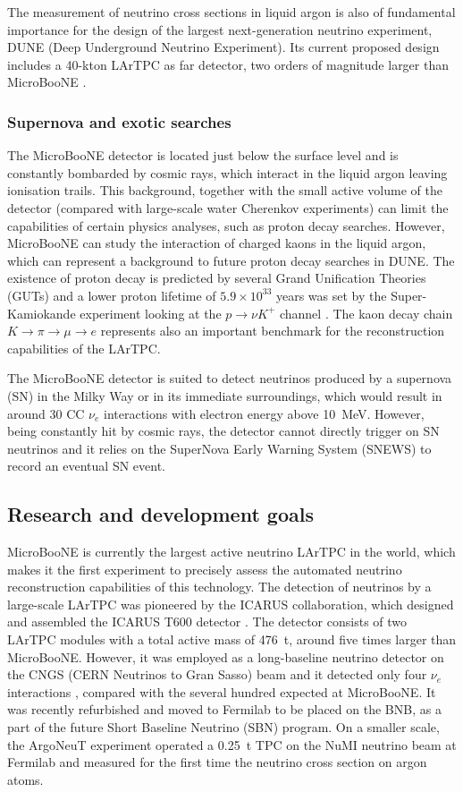 The measurement of neutrino cross sections in liquid argon is also of fundamental importance for the design of the largest next-generation neutrino experiment, DUNE (Deep Underground Neutrino Experiment). Its current proposed design includes a 40-kton LArTPC as far detector, two orders of magnitude larger than MicroBooNE \cite{Acciarri:2016ooe}.

\subsubsection{Supernova and exotic searches}
The MicroBooNE detector is located just below the surface level and is constantly bombarded by cosmic rays, which interact in the liquid argon leaving ionisation trails. This background, together with the small active volume of the detector (compared with large-scale water Cherenkov experiments) can limit the capabilities of certain physics analyses, such as proton decay searches. However, MicroBooNE can study the interaction of charged kaons in the liquid argon, which can represent a background to future proton decay searches in DUNE.
The existence of proton decay is predicted by several Grand Unification Theories (GUTs) and a lower proton lifetime of $5.9\times10^{33}$ years was set by the Super-Kamiokande experiment looking at the $p\rightarrow \nu K^+$ channel \cite{Abe:2014mwa}. The kaon decay chain $K\rightarrow\pi\rightarrow\mu\rightarrow e$ represents also an important benchmark for the reconstruction capabilities of the LArTPC.

The MicroBooNE detector is suited to detect neutrinos produced by a supernova (SN) in the Milky Way or in its immediate surroundings, which would result in around 30 CC $\nu_e$ interactions with electron energy above 10~MeV. However, being constantly hit by cosmic rays, the detector cannot directly trigger on SN neutrinos and it relies on the SuperNova Early Warning System (SNEWS) \cite{Antonioli:2004zb} to record an eventual SN event. 


\subsection{Research and development goals}
MicroBooNE is currently the largest active neutrino LArTPC in the world, which makes it the first experiment to precisely assess the automated neutrino reconstruction capabilities of this technology. The detection of neutrinos by a large-scale LArTPC was pioneered by the ICARUS collaboration, which designed and assembled the ICARUS T600 detector \cite{Amerio:2004ze}. The detector consists of two LArTPC modules with a total active mass of 476~t, around five times larger than MicroBooNE. However, it was employed as a long-baseline neutrino detector on the CNGS (CERN Neutrinos to Gran Sasso) beam and it detected only four $\nu_e$ interactions \cite{Antonello:2013gut}, compared with the several hundred expected at MicroBooNE. It was recently refurbished and moved to Fermilab to be placed on the BNB, as a part of the future Short Baseline Neutrino (SBN) program. On a smaller scale, the ArgoNeuT experiment operated a 0.25~t TPC on the NuMI neutrino beam at Fermilab \cite{Anderson:2012vc} and measured for the first time the neutrino cross section on argon atoms.

